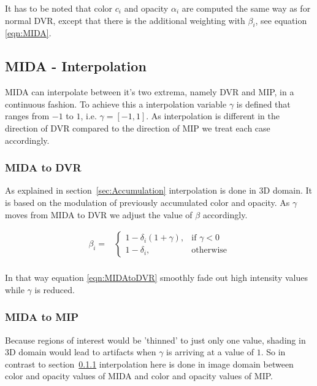It has to be noted that color $c_i$ and opacity $\alpha_i$ are computed the same way as for normal DVR, except that there is the additional weighting with $\beta_i$, see equation \eqref{eqn:MIDA}.

\subsection{MIDA - Interpolation}

MIDA can interpolate between it's two extrema, namely DVR and MIP, in a continuous fashion.
To achieve this a interpolation variable $\gamma$ is defined that ranges from $-1$ to $1$, i.e. $\gamma=[-1,1]$.
As interpolation is different in the direction of DVR compared to the direction of MIP we treat each case accordingly. 

\subsubsection{MIDA to DVR}
\label{seq:MIDAtoDVR}

As explained in section~\ref{sec:Accumulation} interpolation is done in 3D domain. It is based on the modulation of previously accumulated color and opacity. As $\gamma$ moves from MIDA to DVR we adjust the value of $\beta$ accordingly.

\begin{equation}
	\begin{aligned}
	\beta_i = & \begin{cases}
	1 - \delta_i (1 + \gamma), & \text{if $\gamma < 0$}\\
	1 - \delta_i, & \text{otherwise}
	\end{cases} \\
	\end{aligned}
\label{eqn:MIDAtoDVR}
\end{equation}

In that way equation \eqref{eqn:MIDAtoDVR} smoothly fade out high intensity values while $\gamma$ is reduced.

\subsubsection{MIDA to MIP}

Because regions of interest would be 'thinned' to just only one value, shading in 3D domain would lead to artifacts when $\gamma$ is arriving at a value of $1$.
So in contrast to section~\ref{seq:MIDAtoDVR} interpolation here is done in image domain between color and opacity values of MIDA and color and opacity values of MIP. 


